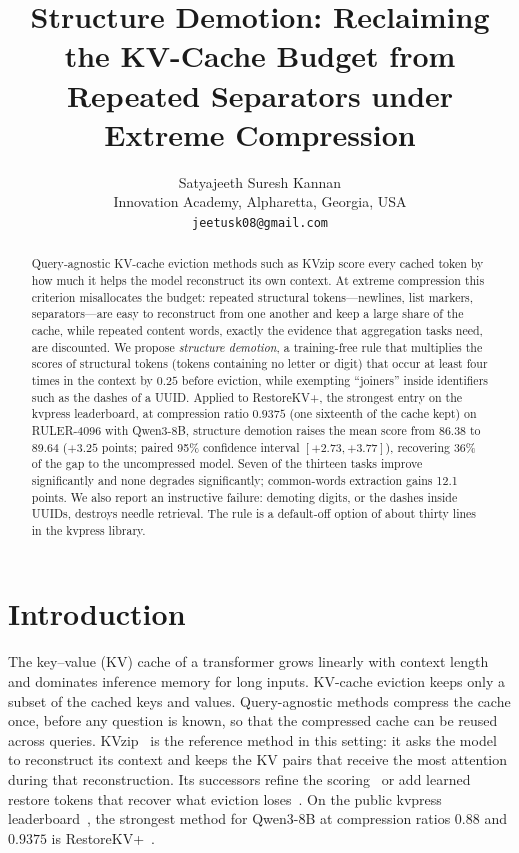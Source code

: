 \documentclass[11pt]{article}
\title{Structure Demotion: Reclaiming the KV-Cache Budget from Repeated Separators under Extreme Compression}
\author{Satyajeeth Suresh Kannan\\
Innovation Academy, Alpharetta, Georgia, USA\\
\texttt{jeetusk08@gmail.com}
}
\date{}
\begin{document}
\maketitle

\begin{abstract}
Query-agnostic KV-cache eviction methods such as KVzip score every cached token by how much it helps the model reconstruct its own
context. At extreme compression this criterion misallocates the budget: repeated structural tokens---newlines, list markers,
separators---are easy to reconstruct from one another and keep a large share of the cache, while repeated content words, exactly
the evidence that aggregation tasks need, are discounted. We propose \emph{structure demotion}, a training-free rule that multiplies
the scores of structural tokens (tokens containing no letter or digit) that occur at least four times in the context by $0.25$
before eviction, while exempting ``joiners'' inside identifiers such as the dashes of a UUID. Applied to RestoreKV+, the strongest
entry on the kvpress leaderboard, at compression ratio $0.9375$ (one sixteenth of the cache kept) on RULER-4096 with Qwen3-8B,
structure demotion raises the mean score from 86.38 to 89.64 ($+3.25$ points; paired 95\% confidence interval $[+2.73, +3.77]$),
recovering 36\% of the gap to the uncompressed model. Seven of the thirteen tasks improve significantly and none degrades
significantly; common-words extraction gains 12.1 points. We also report an instructive failure: demoting digits, or the dashes
inside UUIDs, destroys needle retrieval. The rule is a default-off option of about thirty lines in the kvpress library.
\end{abstract}

\section{Introduction}
The key--value (KV) cache of a transformer grows linearly with context length and dominates inference memory for long inputs.
KV-cache eviction keeps only a subset of the cached keys and values. Query-agnostic methods compress the cache once, before any
question is known, so that the compressed cache can be reused across queries. KVzip~\cite{kim2025kvzip} is the reference method
in this setting: it asks the model to reconstruct its context and keeps the KV pairs that receive the most attention during that
reconstruction. Its successors refine the scoring~\cite{jegou2026kvzap,kim2026fastkvzip} or add learned restore tokens that
recover what eviction loses~\cite{baek2026restorekv}. On the public kvpress leaderboard~\cite{kvpress,kvpressleaderboard}, the
strongest method for Qwen3-8B at compression ratios $0.88$ and $0.9375$ is RestoreKV+~\cite{baek2026restorekv}.
\end{document}
